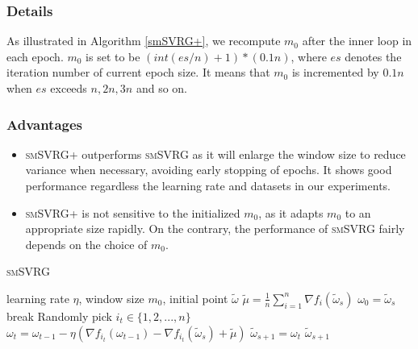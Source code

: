 \documentclass[conference]{IEEEtran}
\begin{document}
 \subsubsection{Details}
 As illustrated in Algorithm \ref{smSVRG+}, we recompute $m_0$ after the inner loop in each epoch. $m_0$ is set to be $(int(es/n)+1) * (0.1n)$, where $es$ denotes the iteration number of current epoch size. It means that $m_0$ is incremented by $0.1n$ when $es$ exceeds $n,2n,3n$ and so on.
 \subsubsection{Advantages}
 \begin{itemize}
 \item \textsc{smSVRG+} outperforms \textsc{smSVRG} as it will enlarge the window size to reduce variance when necessary, avoiding early stopping of epochs. It shows good performance regardless the learning rate and datasets in  our experiments. 
 \item \textsc{smSVRG+} is not sensitive to the initialized $m_0$, as it adapts $m_0$ to an appropriate size rapidly. On the contrary, the performance of \textsc{smSVRG} fairly depends on the choice of $m_0$.
 \end{itemize}
 
 
 \begin{algorithm}[t]
 	\caption{\textsc{smSVRG}}
	\label{smSVRG}
	\begin{algorithmic}[1]
	\Require learning rate $\eta$, window size $m_0$, initial point $\tilde{\omega}$
		\State $\tilde{\mu} = \frac{1}{n}\sum\limits_{i=1}^{n}\nabla f_{i}(\tilde{\omega}_{s})$
		\State $\omega_0 = \tilde{\omega}_s$
			\State break
			\EndIf
			\State Randomly pick $i_t\in\{1, 2, ..., n\}$
			\State $\omega_t = \omega_{t-1} - \eta(\nabla f_{i_t}(\omega_{t-1}) - \nabla f_{i_t}(\tilde{\omega}_s)+\tilde{\mu})$
		\EndFor		
		\State $\tilde{\omega}_{s+1} = \omega_{t}$
	\EndFor
	\State \Return $\tilde{\omega}_{s+1}$
	\end{algorithmic}
\end{algorithm}
\end{document}

